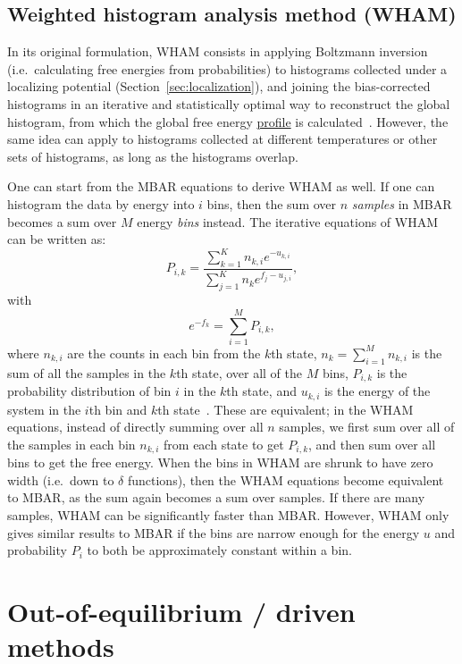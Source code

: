 \documentclass[9pt,review]{livecoms}
\begin{document}
\subsection{Weighted histogram analysis method (WHAM)}

In its original formulation, WHAM consists in applying Boltzmann inversion (i.e.~calculating free energies from probabilities) to histograms collected under a localizing potential (Section~\ref{sec:localization}), and joining the bias-corrected histograms in an iterative and statistically optimal way to reconstruct the global histogram, from which the global free energy \hyperlink{ref:FES} {profile} is calculated~\cite{kumars:WHAM}.  However, the same idea can apply to histograms collected at different temperatures or other sets of histograms, as long as the histograms overlap.

One can start from the MBAR equations to derive WHAM as well. If one can histogram the data by energy into $i$ bins, then the sum over $n$ \textit{samples} in MBAR becomes a sum over $M$ energy \textit{bins} instead. The iterative equations of WHAM can be written as:
\begin{equation}
P_{i,k} = \frac{\sum_{k=1}^K n_{k,i} e^{-u_{k,i}}}{\sum_{j=1}^{K}n_k {e^{f_j-u_{j,i}}}},
\end{equation}
with
\begin{equation}
e^{-f_k} = \sum_{i=1}^M P_{i,k},
\end{equation}
where $n_{k,i}$ are the counts in each bin from the $k$th state, $n_k = \sum_{i=1}^M n_{k,i}$ is the sum of all the samples in the $k$th state, over all of the $M$ bins, $P_{i,k}$ is the probability distribution of bin $i$ in the $k$th state, and $u_{k,i}$ is the energy of the system in the $i$th bin and $k$th state~\cite{kumars:WHAM}. These are equivalent; in the WHAM equations, instead of directly summing over all $n$ samples, we first sum over all of the samples in each bin $n_{k,i}$ from each state to get $P_{i,k}$, and then sum over all bins to get the free energy. When the bins in WHAM are shrunk to have zero width (i.e.~down to $\delta$ functions), then the WHAM equations become equivalent to MBAR, as the sum again becomes a sum over samples. If there are many samples, WHAM can be significantly faster than MBAR. However, WHAM only gives similar results to MBAR if the bins are narrow enough for the energy $u$ and probability $P_i$ to both be approximately constant within a bin.

\section{Out-of-equilibrium / driven methods}
\label{sec:Out-of-equilibrium_driven}
\end{document}
